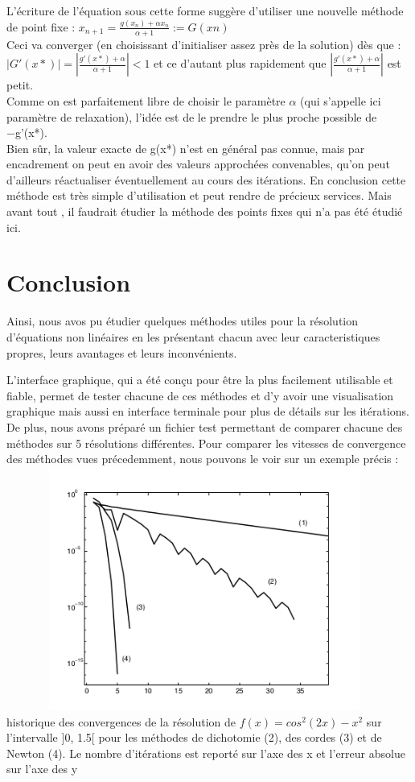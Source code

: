 \documentclass{article}
\begin{document}
L'écriture de l'équation sous cette forme suggère d'utiliser
une nouvelle méthode de point fixe :
    $x_{n+1} = \frac{g(x_n) + \alpha x_n}{ \alpha + 1 }:= G(xn)$ \\
  Ceci  va converger (en choisissant
d'initialiser assez près de la solution) dès que :
    $|G'(x*)|=|\frac{g'(x*) + \alpha }{\alpha + 1} | < 1$ et ce d'autant plus rapidement que  $|\frac{g'(x*) + \alpha }{\alpha + 1} |$ est petit. \\
    Comme on est parfaitement libre de choisir le paramètre $\alpha$ (qui s'appelle ici paramètre de relaxation), l'idée est de le prendre le plus proche possible de −g'(x*).\\ Bien sûr, la valeur exacte de g(x*) n'est en général pas connue, mais par encadrement on peut en avoir des valeurs approchées convenables, qu'on peut d'ailleurs réactualiser éventuellement au cours des itérations. En conclusion cette méthode est très simple d'utilisation et peut rendre de précieux services. Mais avant tout , il faudrait étudier la méthode des points fixes qui n'a pas été étudié ici.
\newpage
\section{Conclusion}
    Ainsi, nous avos pu étudier quelques méthodes utiles pour la résolution d'équations non linéaires en les présentant chacun avec leur caracteristiques propres, leurs avantages et leurs inconvénients.
    
    L'interface graphique, qui a été conçu pour être la plus facilement utilisable et fiable, permet de tester chacune de ces méthodes et d'y avoir une visualisation graphique mais aussi en interface terminale pour plus de détails sur les itérations. De plus, nous avons préparé un fichier test permettant de comparer chacune des méthodes sur 5 résolutions différentes.
    Pour comparer les vitesses de convergence des méthodes vues précedemment, nous pouvons le voir sur un exemple précis : \\
    \includegraphics[width=13cm,height=8cm]{img/interpretation/convergence.png}\\
historique des convergences de la résolution de $f(x) = cos^2 (2x) - x^2$ sur l’intervalle ]0, 1.5[ pour les méthodes de dichotomie (2), des cordes (3) et de Newton (4). Le nombre d’itérations est reporté sur l’axe des x et l’erreur absolue sur l’axe des y
\end{document}
